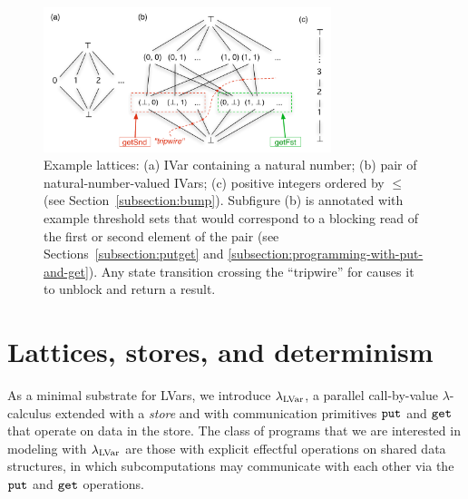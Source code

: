 
\begin{figure}[tb]
\centering
\includegraphics[width=3.3in,natwidth=633px,natheight=319px]{chapter2/figures/ExampleLattices2.pdf} 
  \caption{\footnotesize Example lattices: (a) IVar
    containing a natural number; (b) pair of natural-number-valued IVars; (c)
    positive integers ordered by $\leq$ (see Section~\ref{subsection:bump}).
    Subfigure (b) is annotated with example threshold
    sets that would correspond to a blocking read of the first or
    second element of the pair (see Sections~\ref{subsection:putget} and \ref{subsection:programming-with-put-and-get}).
    Any state transition crossing the
    ``tripwire'' for  causes it to unblock
    and return a result.}

  \label{f:lattice-examples}
\end{figure}

\section{Lattices, stores, and determinism}\label{section:domains}


As a minimal substrate for LVars, we introduce $\lambda_{\textrm{LVar}}$, 
 a parallel call-by-value
$\lambda$-calculus extended with a {\em store} and with communication
primitives $\mbox{\texttt{put}}$ and $\mbox{\texttt{get}}$ that operate on data in the store.
The class of programs that we are interested in modeling with
$\lambda_{\textrm{LVar}}$ are those with explicit effectful operations on shared
data
structures, in which subcomputations may communicate with each other
via the $\mbox{\texttt{put}}$ and
$\mbox{\texttt{get}}$ operations.

